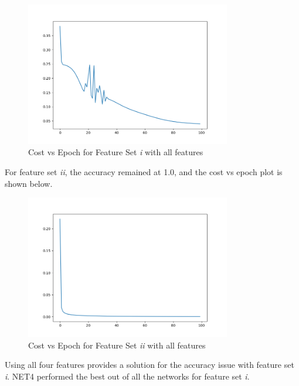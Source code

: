 \documentclass{article}
\begin{document}
\begin{figure}[H]
  \centering
  \includegraphics[width=0.8\textwidth]{Figure_8.png}
  \caption{Cost vs Epoch for Feature Set \textit{i} with all features}
\end{figure}

For feature set \textit{ii}, the accuracy remained at 1.0, and the cost vs epoch plot is shown below.

\begin{figure}[H]
  \centering
  \includegraphics[width=0.8\textwidth]{Figure_9.png}
  \caption{Cost vs Epoch for Feature Set \textit{ii} with all features}
\end{figure}

Using all four features provides a solution for the accuracy issue with feature set \textit{i}.
NET4 performed the best out of all the networks for feature set \textit{i}.
\end{document}
